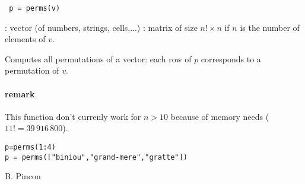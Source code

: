 
\begin{mandesc}
\end{mandesc}

\begin{calling_sequence}
\begin{verbatim}
 p = perms(v)
\end{verbatim}
\end{calling_sequence}

\begin{parameters}
  \begin{varlist}
   : vector (of numbers, strings, cells,...)
   : matrix of size $n! \times n$ if $n$ is the number of
               elements of $v$.
  \end{varlist}
\end{parameters}

\begin{mandescription}
  Computes all permutations of a vector: each row of $p$
  corresponds to a permutation of $v$. 

\paragraph{remark}
This function don't currenly work for $n > 10$ because of memory
needs ($11! = 39\,916\,800$).

\end{mandescription}

\begin{examples}
\begin{Verbatim}
p=perms(1:4)
p = perms(["biniou","grand-mere","gratte"])
\end{Verbatim}
\end{examples}


\begin{manseealso}
\end{manseealso}

\begin{authors}
B. Pincon
\end{authors}

